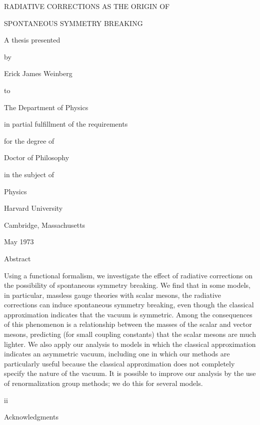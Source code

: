 \documentclass[12pt,epsf]{report}
\begin{document}
\baselineskip 18pt

\centerline{RADIATIVE CORRECTIONS AS THE ORIGIN OF}
\centerline{SPONTANEOUS SYMMETRY BREAKING}

\bigskip

\centerline{A thesis presented}
\medskip

\centerline{by}
\medskip

\centerline{Erick James Weinberg}
\medskip

\centerline{to}

\centerline{The Department of Physics}

\centerline{in partial fulfillment of the requirements}
\centerline{for the degree of}
\centerline{Doctor of Philosophy}
\centerline{in the subject of}
\centerline{Physics}

\bigskip

\centerline{Harvard University}
\centerline{Cambridge, Massachusetts}
\centerline{May 1973}

\setcounter{page}{0}
\thispagestyle{empty}

\eject



\centerline{Abstract}

\bigskip


Using a functional formalism, we investigate the effect of radiative
corrections on the possibility of spontaneous symmetry breaking.  We
find that in some models, in particular, massless gauge theories with
scalar mesons, the radiative corrections can induce spontaneous
symmetry breaking, even though the classical approximation indicates
that the vacuum is symmetric.  Among the consequences of this
phenomenon is a relationship between the masses of the scalar and
vector mesons, predicting (for small coupling constants) that the
scalar mesons are much lighter.  We also apply our analysis to models
in which the classical approximation indicates an asymmetric vacuum,
including one in which our methods are particularly useful because the
classical approximation does not completely specify the nature of the
vacuum.  It is possible to improve our analysis by the use of 
renormalization group methods; we do this for several models.

\thispagestyle{empty}

\vfill 

\centerline{ii}

\eject



\centerline{Acknowledgments}
\end{document}
